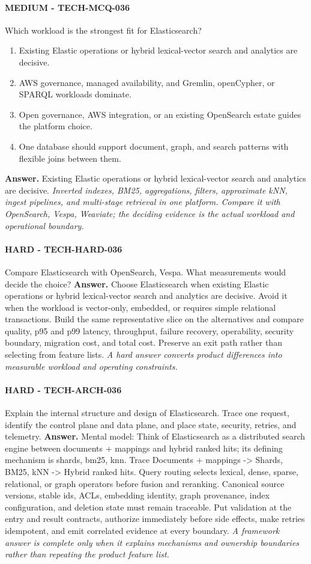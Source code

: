 \paragraph{MEDIUM - TECH-MCQ-036} Which workload is the strongest fit for Elasticsearch?
\begin{enumerate}[label=\Alph*.]
\item Existing Elastic operations or hybrid lexical-vector search and analytics are decisive.
\item AWS governance, managed availability, and Gremlin, openCypher, or SPARQL workloads dominate.
\item Open governance, AWS integration, or an existing OpenSearch estate guides the platform choice.
\item One database should support document, graph, and search patterns with flexible joins between them.
\end{enumerate}
\textbf{Answer.} Existing Elastic operations or hybrid lexical-vector search and analytics are decisive.
\textit{Inverted indexes, BM25, aggregations, filters, approximate kNN, ingest pipelines, and multi-stage retrieval in one platform. Compare it with OpenSearch, Vespa, Weaviate; the deciding evidence is the actual workload and operational boundary.}
\paragraph{HARD - TECH-HARD-036} Compare Elasticsearch with OpenSearch, Vespa. What measurements would decide the choice?
\textbf{Answer.} Choose Elasticsearch when existing Elastic operations or hybrid lexical-vector search and analytics are decisive. Avoid it when the workload is vector-only, embedded, or requires simple relational transactions. Build the same representative slice on the alternatives and compare quality, p95 and p99 latency, throughput, failure recovery, operability, security boundary, migration cost, and total cost. Preserve an exit path rather than selecting from feature lists.
\textit{A hard answer converts product differences into measurable workload and operating constraints.}
\paragraph{HARD - TECH-ARCH-036} Explain the internal structure and design of Elasticsearch. Trace one request, identify the control plane and data plane, and place state, security, retries, and telemetry.
\textbf{Answer.} Mental model: Think of Elasticsearch as a distributed search engine between documents + mappings and hybrid ranked hits; its defining mechanism is shards, bm25, knn. Trace Documents + mappings -> Shards, BM25, kNN -> Hybrid ranked hits. Query routing selects lexical, dense, sparse, relational, or graph operators before fusion and reranking. Canonical source versions, stable ids, ACLs, embedding identity, graph provenance, index configuration, and deletion state must remain traceable. Put validation at the entry and result contracts, authorize immediately before side effects, make retries idempotent, and emit correlated evidence at every boundary.
\textit{A framework answer is complete only when it explains mechanisms and ownership boundaries rather than repeating the product feature list.}

